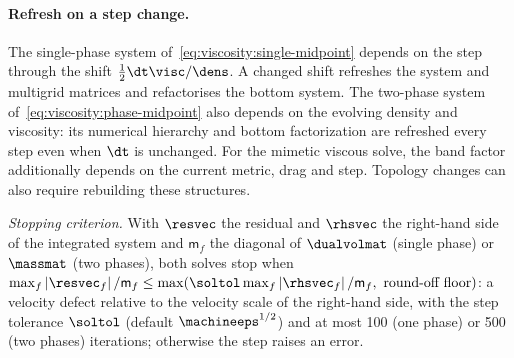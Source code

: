 \paragraph{Refresh on a step change.}\label{sec:viscosity:refresh}
The single-phase system of~\cref{eq:viscosity:single-midpoint} depends
on the step through the shift $\half\dt\visc/\dens$. A changed shift
refreshes the system and multigrid matrices and refactorises the bottom
system. The two-phase system of~\cref{eq:viscosity:phase-midpoint} also
depends on the evolving density and viscosity: its numerical hierarchy and
bottom factorization are refreshed every step even when $\dt$ is unchanged.
For the mimetic viscous solve, the band factor additionally depends on the
current metric, drag and step. Topology changes can also require rebuilding
these structures.

\emph{Stopping criterion.} With $\resvec$ the residual and $\rhsvec$ the
right-hand side of the integrated system and $\mathsf{m}_f$ the diagonal of
$\dualvolmat$ (single phase) or $\massmat$ (two phases), both solves stop
when $\max_f\abs{\resvec_f}/\mathsf{m}_f\le\max(\soltol\max_f\abs{\rhsvec_f}/\mathsf{m}_f,\ \text{round-off floor})$:
a velocity defect relative to the velocity scale of the right-hand side,
with the step tolerance $\soltol$ (default $\machineeps^{1/2}$) and at most
100 (one phase) or 500 (two phases) iterations; otherwise the step raises
an error.

